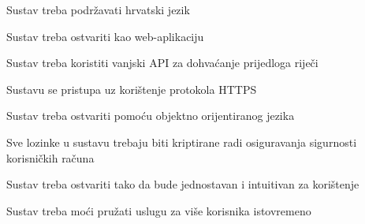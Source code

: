			\begin{packed_enum}
				
				\item Sustav treba podržavati hrvatski jezik
				\item Sustav treba ostvariti kao web-aplikaciju
				\item Sustav treba koristiti vanjski API za dohvaćanje prijedloga riječi
				\item Sustavu se pristupa uz korištenje protokola HTTPS
				\item Sustav treba ostvariti pomoću objektno orijentiranog jezika
				\item Sve lozinke u sustavu trebaju biti kriptirane radi osiguravanja sigurnosti korisničkih računa
				\item Sustav treba ostvariti tako da bude jednostavan i intuitivan za korištenje
				\item Sustav treba moći pružati uslugu za više korisnika istovremeno
				
			\end{packed_enum}
		
%		 
			 
			 
			 
	
